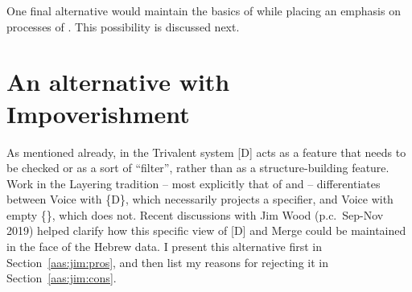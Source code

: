 \begin{exe}
\begin{xlist}
\begin{exe}
\begin{exe}
\begin{xlist}
\begin{exe}
\begin{exe}
\begin{exe}
\begin{exe}
\begin{exe}
\begin{xlist}
\begin{exe}
One final alternative would maintain the basics of  while placing an emphasis on processes of . This possibility is discussed next.

\section{An alternative with Impoverishment} \label{aas:jim}

\label{r1:g:2c2}As mentioned already, in the Trivalent system [D] acts as a feature that needs to be checked or as a sort of ``filter'', rather than as a structure-building feature. Work in the Layering tradition -- most explicitly that of \cite{schaefer08} and \cite{wood15springer} -- differentiates between Voice with \{D\}, which necessarily projects a specifier, and Voice with empty \{\}, which does not. Recent discussions with Jim Wood (p.c.~Sep-Nov 2019) helped clarify how this specific view of [D] and Merge could be maintained in the face of the Hebrew data. I present this alternative first in Section~\ref{aas:jim:pros}, and then list my reasons for rejecting it in Section~\ref{aas:jim:cons}.


\end{exe}
\end{xlist}
\end{exe}
\end{exe}
\end{exe}
\end{exe}
\end{exe}
\end{xlist}
\end{exe}
\end{exe}
\end{xlist}
\end{exe}
